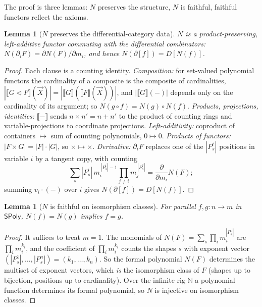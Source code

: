 \documentclass[11pt]{article}
\newtheorem{lemma}[theorem]{Lemma}
\theoremstyle{definition}
\newcommand{\SPoly}{\mathsf{SPoly}}
\newcommand{\N}{\mathbb{N}}
\newcommand{\sem}[1]{\llbracket #1 \rrbracket}
\begin{document}
The proof is three lemmas: $N$ preserves the structure, $N$ is faithful, faithful functors reflect
the axioms.

\begin{lemma}[$N$ preserves the differential-category data]\label{lem:preserve}
$N$ is a product-preserving, left-additive functor commuting with the differential combinators:
$N(\partial_iF)=\partial N(F)/\partial m_i$, and hence $N(\partial[f])=D[N(f)]$.
\end{lemma}

\begin{proof}
Each clause is a counting identity.
\emph{Composition:} for set-valued polynomial functors the cardinality of a composite is the composite
of cardinalities, $|\sem{G\lhd F}(\vec X)|=|\sem{G}(\sem{F}(\vec X))|$, and $|\sem{G}(-)|$ depends only
on the cardinality of its argument; so $N(g\circ f)=N(g)\circ N(f)$.
\emph{Products, projections, identities:} $\sem{-}$ sends $n\times n'=n+n'$ to the product of counting
rings and variable-projections to coordinate projections.
\emph{Left-additivity:} coproduct of containers $\mapsto$ sum of counting polynomials, $0\mapsto0$.
\emph{Products of functors:} $|F\times G|=|F|\cdot|G|$, so $\times\mapsto\times$.
\emph{Derivative:} $\partial_iF$ replaces one of the $|P^i_s|$ positions in variable $i$ by a tangent
copy, with counting
\[
  \sum_{s}|P^i_s|\,m_i^{\,|P^i_s|-1}\prod_{j\neq i}m_j^{\,|P^j_s|}
  =\frac{\partial}{\partial m_i}N(F);
\]
summing $v_i\cdot(-)$ over $i$ gives $N(\partial[f])=D[N(f)]$.
\end{proof}

\begin{lemma}[$N$ is faithful on isomorphism classes]\label{lem:faithful}
For parallel $f,g\colon n\to m$ in $\SPoly$, $N(f)=N(g)$ implies $f=g$.
\end{lemma}

\begin{proof}
It suffices to treat $m=1$. The monomials of $N(F)=\sum_s\prod_i m_i^{|P^i_s|}$ are $\prod_i
m_i^{k_i}$, and the coefficient of $\prod_i m_i^{k_i}$ counts the shapes $s$ with exponent vector
$(|P^1_s|,\dots,|P^n_s|)=(k_1,\dots,k_n)$. So the formal polynomial $N(F)$ determines the multiset of
exponent vectors, which \emph{is} the isomorphism class of $F$ (shapes up to bijection, positions up
to cardinality). Over the infinite rig $\N$ a polynomial function determines its formal polynomial, so
$N$ is injective on isomorphism classes.
\end{proof}
\end{document}
